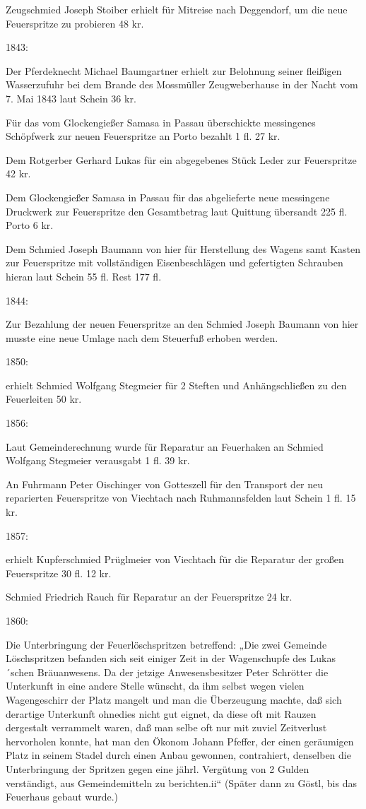 \documentclass{book}
\begin{document}
Zeugschmied Joseph Stoiber erhielt für Mitreise nach Deggendorf, um die neue
Feuerspritze zu probieren 48 kr.

1843:

Der Pferdeknecht Michael Baumgartner erhielt zur Belohnung seiner fleißigen
Wasserzufuhr bei dem Brande des Mossmüller Zeugweberhause in der Nacht vom 7.
Mai 1843 laut Schein 36 kr.

Für das vom Glockengießer Samasa in Passau überschickte messingenes Schöpfwerk
zur neuen Feuerspritze an Porto bezahlt 1 fl. 27 kr.

Dem Rotgerber Gerhard Lukas für ein abgegebenes Stück Leder zur Feuerspritze 42
kr.

Dem Glockengießer Samasa in Passau für das abgelieferte neue messingene
Druckwerk zur Feuerspritze den Gesamtbetrag laut Quittung übersandt 225 fl.
Porto 6 kr.

Dem Schmied Joseph Baumann von hier für Herstellung des Wagens samt Kasten zur
Feuerspritze mit vollständigen Eisenbeschlägen und gefertigten Schrauben hieran
laut Schein 55 fl. Rest 177 fl.

1844:

Zur Bezahlung der neuen Feuerspritze an den Schmied Joseph Baumann von hier
musste eine neue Umlage nach dem Steuerfuß erhoben werden.

1850:

erhielt Schmied Wolfgang Stegmeier für 2 Steften und Anhängschließen zu den
Feuerleiten 50 kr.

1856:

Laut Gemeinderechnung wurde für Reparatur an Feuerhaken an Schmied Wolfgang
Stegmeier verausgabt 1 fl. 39 kr.

An Fuhrmann Peter Oischinger von Gotteszell für den Transport der neu
reparierten Feuerspritze von Viechtach nach Ruhmannsfelden laut Schein 1 fl. 15
kr.

1857:

erhielt Kupferschmied Prüglmeier von Viechtach für die Reparatur der großen
Feuerspritze 30 fl. 12 kr.

Schmied Friedrich Rauch für Reparatur an der Feuerspritze 24 kr.

1860:

Die Unterbringung der Feuerlöschspritzen betreffend: „Die zwei Gemeinde
Löschspritzen befanden sich seit einiger Zeit in der Wagenschupfe des
Lukas´schen Bräuanwesens. Da der jetzige Anwesensbesitzer Peter Schrötter die
Unterkunft in eine andere Stelle wünscht, da ihm selbst wegen vielen
Wagengeschirr der Platz mangelt und man die Überzeugung machte, daß sich
derartige Unterkunft ohnedies nicht gut eignet, da diese oft mit Rauzen
dergestalt verrammelt waren, daß man selbe oft nur mit zuviel Zeitverlust
hervorholen konnte, hat man den Ökonom Johann Pfeffer, der einen geräumigen
Platz in seinem Stadel durch einen Anbau gewonnen, contrahiert, denselben die
Unterbringung der Spritzen gegen eine jährl. Vergütung von 2 Gulden verständigt,
aus Gemeindemitteln zu berichten.ii“ (Später dann zu Göstl, bis das Feuerhaus
gebaut wurde.)
\end{document}
